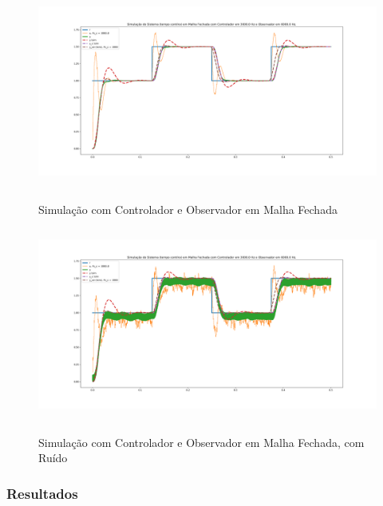 \documentclass[
	12pt,				%
	article,			%
	openright,			%
	oneside,
	a4paper,			%
	chapter=TITLE,		%
	section=TITLE,		%
	english,			%
	french,				%
	spanish,			%
	brazil,				%
]{abntex2}
\begin{document}
                \begin{figure}[htbp]
                	\centering
                	\caption{Simulação com Controlador e Observador em Malha Fechada}
                	\includegraphics[width=\textwidth,height=240px,keepaspectratio]{imgs/step_response_closedloop_observer.png}
                	\label{fig-step_response_closedloop_observer}
            	\end{figure}
            	
            	\begin{figure}[htbp]
                	\centering
                	\caption{Simulação com Controlador e Observador em Malha Fechada, com Ruído}
                	\includegraphics[width=\textwidth,height=240px,keepaspectratio]{imgs/step_response_closedloop_observer_noise.png}
                	\label{fig-step_response_closedloop_observer_noise}
            	\end{figure}
            	
            	\FloatBarrier
            
            \subsubsection{Resultados}
            
\end{document}
